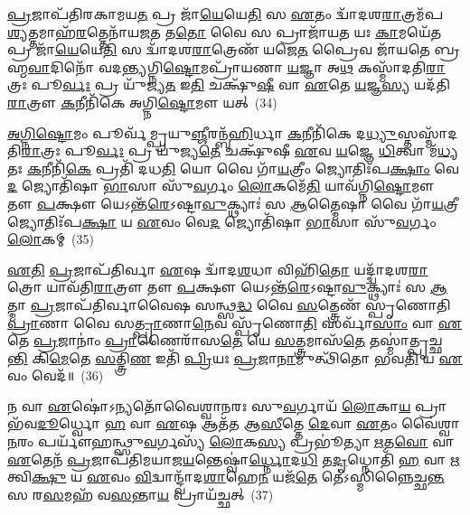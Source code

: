 {\anuvakamend[{\-\ul{𑌏}\-𑌤𑌦𑍍𑌵𑍈 𑌪᳴\-\ul{𑌞𑍍𑌚}\-𑌮𑍇\-𑌽\-\ul{𑌹}\-𑌨𑍍𑌤𑍍𑌰𑍈𑌷𑍍𑌟𑍁᳴𑌭 \ul{𑌏}\-𑌤𑌦𑍍𑌗𑍃᳴𑌹𑍍𑌯𑌤𑍇 \ul{𑌯}\-𑌜𑍍𑌞𑌸𑍍𑌯᳴ 𑌪़\-\ul{𑌞𑍍𑌚}\-𑌮\-\ul{𑌮}\-𑌨𑍍𑌯\-\ul{𑌸𑍍𑌮𑌾} 𑌏𑌕᳴𑌞𑍍𑌚}]}%

\-\ul{𑌪𑍍𑌰}\-𑌜𑌾𑌪᳴𑌤𑌿𑌰𑌕𑌾𑌮𑌯\-\ul{𑌤} 𑌪𑍍𑌰 𑌜𑌾᳴\-\ul{𑌯𑍇}\-𑌯𑍇\-\ul{𑌤𑌿} 𑌸 \ul{𑌏}\-𑌤𑌂 𑌦𑍍𑌵𑌾᳴𑌦𑌶\-\ul{𑌰𑌾}\-𑌤𑍍𑌰𑌮᳴𑌪\-\ul{𑌶𑍍𑌯}\-𑌤𑍍𑌤𑌮𑌾𑌹᳴\-\ul{𑌰}\-𑌤𑍍𑌤𑍇𑌨𑌾᳴𑌯𑌜\-\ul{𑌤} 𑌤\-\ul{𑌤𑍋} 𑌵𑍈 𑌸 𑌪𑍍𑌰𑌾𑌜𑌾᳴𑌯\-\ul{𑌤} 𑌯𑌃 \ul{𑌕𑌾}\-𑌮𑌯𑍇᳴\-\ul{𑌤} 𑌪𑍍𑌰 𑌜𑌾᳴\-\ul{𑌯𑍇}\-𑌯𑍇\-\ul{𑌤𑌿} 𑌸 𑌦𑍍𑌵𑌾᳴𑌦𑌶\-\ul{𑌰𑌾}\-𑌤𑍍𑌰𑍇𑌣᳴ 𑌯𑌜𑍇\-\ul{𑌤} 𑌪𑍍𑌰𑍈𑌵 𑌜𑌾᳴𑌯𑌤𑍇 𑌬𑍍𑌰𑌹𑍍𑌮\-\ul{𑌵𑌾}\-𑌦𑌿𑌨𑍋᳴ 𑌵𑌦𑌨𑍍𑌤𑍍𑌯𑌗𑍍𑌨𑌿\-\ul{𑌷𑍍𑌟𑍋}\-𑌮𑌪𑍍𑌰𑌾᳴𑌯𑌣𑌾 \ul{𑌯}\-𑌜𑍍𑌞𑌾 𑌅\-\ul{𑌥} 𑌕𑌸𑍍𑌮𑌾᳴𑌦𑌤𑌿\-\ul{𑌰𑌾}\-𑌤𑍍𑌰𑌃 𑌪𑍂\-\ul{𑌰𑍍𑌵𑌃} 𑌪𑍍𑌰 𑌯𑍁᳴𑌜𑍍𑌯\-\ul{𑌤} 𑌇\-\ul{𑌤𑌿} 𑌚𑌕𑍍𑌷𑍁᳴\-\ul{𑌷𑍀} 𑌵𑌾 \ul{𑌏}\-𑌤𑍇 \ul{𑌯}\-𑌜𑍍𑌞\-\ul{𑌸𑍍𑌯} 𑌯𑌦᳴𑌤𑌿\-\ul{𑌰𑌾}\-𑌤𑍍𑌰𑍗 \ul{𑌕}\-𑌨𑍀𑌨𑌿᳴𑌕𑍇 𑌅𑌗𑍍𑌨𑌿\-\ul{𑌷𑍍𑌟𑍋}\-𑌮𑍗 𑌯𑌤𑍍~(34)

\-\ul{𑌅}\-\-\ul{𑌗𑍍𑌨𑌿}\-\-\ul{𑌷𑍍𑌟𑍋}\-𑌮𑌂 𑌪𑍂𑌰𑍍𑌵᳴𑌮𑍍𑌪𑍍𑌰𑌯𑍁\-\ul{𑌞𑍍𑌜𑍀}\-𑌰𑌨𑍍𑌬᳴\-\ul{𑌹𑌿}\-𑌰𑍍𑌧𑌾 \ul{𑌕}\-𑌨𑍀𑌨𑌿᳴𑌕𑍇 𑌦\-\ul{𑌧𑍍𑌯𑍁}\-𑌸𑍍𑌤𑌸𑍍𑌮𑌾᳴𑌦𑌤𑌿\-\ul{𑌰𑌾}\-𑌤𑍍𑌰𑌃 𑌪𑍂\-\ul{𑌰𑍍𑌵𑌃} 𑌪𑍍𑌰 𑌯𑍁᳴𑌜𑍍𑌯\-\ul{𑌤𑍇} 𑌚𑌕𑍍𑌷𑍁᳴𑌷𑍀 \ul{𑌏}\-𑌵 \ul{𑌯}\-𑌜𑍍𑌞𑍇 \ul{𑌧𑌿}\-𑌤𑍍𑌵𑌾 𑌮᳴\-\ul{𑌧𑍍𑌯}\-𑌤𑌃 \ul{𑌕}\-𑌨𑍀𑌨𑌿᳴\-\ul{𑌕𑍇} 𑌪𑍍𑌰𑌤𑌿᳴ 𑌦𑌧\-\ul{𑌤𑌿} 𑌯𑍋 𑌵𑍈 𑌗𑌾᳴\-\ul{𑌯}\-𑌤𑍍𑌰𑍀𑌂 𑌜𑍍𑌯𑍋𑌤𑌿𑌃᳴𑌪\-\ul{𑌕𑍍𑌷𑌾𑌂} 𑌵𑍇\-\ul{𑌦} 𑌜𑍍𑌯𑍋𑌤𑌿᳴𑌷𑌾 \ul{𑌭𑌾}\-𑌸𑌾 𑌸𑍁᳴\-\ul{𑌵}\-𑌰𑍍𑌗𑌂 \ul{𑌲𑍋}\-𑌕𑌮𑍇᳴\-\ul{𑌤𑌿} 𑌯𑌾𑌵᳴𑌗𑍍𑌨𑌿\-\ul{𑌷𑍍𑌟𑍋}\-𑌮𑍗 𑌤𑍗 \ul{𑌪}\-𑌕𑍍𑌷𑍗 𑌯𑍇\-𑌽𑌨𑍍𑌤᳴\-\ul{𑌰𑍇}\-\-𑌽𑌷𑍍𑌟𑌾\-\ul{𑌵𑍁}\-𑌕𑍍𑌥𑍍𑌯𑌾𑌃॑ 𑌸 \ul{𑌆}\-𑌤𑍍𑌮𑍈𑌷𑌾 𑌵𑍈 𑌗𑌾᳴\-\ul{𑌯}\-𑌤𑍍𑌰𑍀 𑌜𑍍𑌯𑍋𑌤𑌿𑌃᳴𑌪\-\ul{𑌕𑍍𑌷𑌾} 𑌯 \ul{𑌏}\-𑌵𑌂 𑌵𑍇\-\ul{𑌦} 𑌜𑍍𑌯𑍋𑌤𑌿᳴𑌷𑌾 \ul{𑌭𑌾}\-𑌸𑌾 𑌸𑍁᳴\-\ul{𑌵}\-𑌰𑍍𑌗𑌂 \ul{𑌲𑍋}\-𑌕𑌮𑍍~(35)

\-\ul{𑌏}\-\-\ul{𑌤𑌿} \ul{𑌪𑍍𑌰}\-𑌜𑌾𑌪᳴𑌤𑌿𑌰𑍍𑌵𑌾 \ul{𑌏}\-𑌷 𑌦𑍍𑌵𑌾᳴𑌦\-\ul{𑌶}\-𑌧𑌾 𑌵𑌿𑌹𑌿᳴\-\ul{𑌤𑍋} 𑌯𑌦𑍍𑌦𑍍𑌵𑌾᳴𑌦𑌶\-\ul{𑌰𑌾}\-𑌤𑍍𑌰𑍋 𑌯𑌾𑌵᳴𑌤𑌿\-\ul{𑌰𑌾}\-𑌤𑍍𑌰𑍗 𑌤𑍗 \ul{𑌪}\-𑌕𑍍𑌷𑍗 𑌯𑍇\-𑌽𑌨𑍍𑌤᳴\-\ul{𑌰𑍇}\-\-𑌽𑌷𑍍𑌟𑌾\-\ul{𑌵𑍁}\-𑌕𑍍𑌥𑍍𑌯𑌾𑌃॑ 𑌸 \ul{𑌆}\-𑌤𑍍𑌮𑌾 \ul{𑌪𑍍𑌰}\-𑌜𑌾𑌪᳴𑌤𑌿𑌰𑍍𑌵𑌾𑌵𑍈𑌷 𑌸𑌨𑍍𑌥𑍍𑌸\-\ul{𑌦𑍍𑌧} 𑌵𑍈 \ul{𑌸}\-𑌤𑍍𑌤𑍍𑌰𑍇𑌣᳴ 𑌸𑍍𑌪𑍃𑌣𑍋𑌤𑌿 \ul{𑌪𑍍𑌰𑌾}\-𑌣𑌾 𑌵𑍈 𑌸\-\ul{𑌤𑍍𑌪𑍍𑌰𑌾}\-𑌣𑌾\-\ul{𑌨𑍇}\-𑌵 𑌸𑍍𑌪𑍃᳴𑌣𑍋\-\ul{𑌤𑌿} 𑌸𑌰𑍍𑌵𑌾᳴\-\ul{𑌸𑌾𑌂} 𑌵𑌾 \ul{𑌏}\-𑌤𑍇 \ul{𑌪𑍍𑌰}\-𑌜𑌾𑌨𑌾𑌂॑ \ul{𑌪𑍍𑌰𑌾}\-𑌣𑍈𑌰𑌾᳴𑌸\-\ul{𑌤𑍇} 𑌯𑍇 \ul{𑌸}\-𑌤𑍍𑌤𑍍𑌰𑌮𑌾𑌸᳴\-\ul{𑌤𑍇} 𑌤𑌸𑍍𑌮𑌾॑𑌤𑍍𑌪𑍃𑌚𑍍𑌛\-\ul{𑌨𑍍𑌤𑌿} 𑌕𑌿\-\ul{𑌮𑍇}\-𑌤𑍇 \ul{𑌸}\-𑌤𑍍𑌤𑍍𑌰𑌿\-\ul{𑌣} 𑌇𑌤𑌿᳴ \ul{𑌪𑍍𑌰𑌿}\-𑌯𑌃 \ul{𑌪𑍍𑌰}\-𑌜𑌾\-\ul{𑌨𑌾}\-𑌮𑍁𑌤𑍍𑌥𑌿᳴𑌤𑍋 𑌭𑌵\-\ul{𑌤𑌿} 𑌯 \ul{𑌏}\-𑌵𑌂 𑌵𑍇𑌦᳴॥~(36)

{\anuvakamend[{\-\ul{𑌅}\-\-\ul{𑌗𑍍𑌨𑌿}\-\-\ul{𑌷𑍍𑌟𑍋}\-𑌮𑍗 𑌯𑌥𑍍𑌸𑍁᳴\-\ul{𑌵}\-𑌰𑍍𑌗\-\ul{𑌲𑍍𑌲𑍋𑌂}\-𑌕𑌂 \ul{𑌪𑍍𑌰𑌿}\-𑌯𑌃 \ul{𑌪𑍍𑌰}\-𑌜𑌾\-\ul{𑌨𑌾𑌂} 𑌪𑌞𑍍𑌚᳴ 𑌚}]}%

𑌨 𑌵𑌾 \ul{𑌏}\-𑌷𑍋॑\-𑌽𑌨𑍍𑌯𑌤𑍋᳴𑌵𑍈𑌶𑍍𑌵𑌾𑌨𑌰𑌃 𑌸𑍁\-\ul{𑌵}\-𑌰𑍍𑌗𑌾𑌯᳴ \ul{𑌲𑍋}\-𑌕𑌾\-\ul{𑌯} 𑌪𑍍𑌰𑌾𑌭᳴𑌵\-\ul{𑌦𑍂}\-𑌰𑍍𑌧𑍍𑌵𑍋 \ul{𑌹} 𑌵𑌾 \ul{𑌏}\-𑌷 𑌆𑌤᳴𑌤 𑌆\-\ul{𑌸𑍀}\-𑌤𑍍𑌤𑍇 \ul{𑌦𑍇}\-𑌵𑌾 \ul{𑌏}\-𑌤𑌂 𑌵𑍈॑𑌶𑍍𑌵𑌾\-\ul{𑌨}\-𑌰𑌂 𑌪𑌰𑍍𑌯𑍗᳴𑌹𑌨𑍍𑌥𑍍𑌸𑍁\-\ul{𑌵}\-𑌰𑍍𑌗𑌸𑍍𑌯᳴ \ul{𑌲𑍋}\-𑌕\-\ul{𑌸𑍍𑌯} 𑌪𑍍𑌰𑌭𑍂॑𑌤𑍍𑌯𑌾 \ul{𑌋}\-𑌤\-\ul{𑌵𑍋} 𑌵𑌾 \ul{𑌏}\-𑌤𑍇𑌨᳴ \ul{𑌪𑍍𑌰}\-𑌜𑌾𑌪᳴𑌤𑌿𑌮𑌯𑌾𑌜\-\ul{𑌯}\-𑌨𑍍𑌤𑍇𑌷𑍍𑌵𑌾॑\-\ul{𑌰𑍍𑌧𑍍𑌨𑍋}\-𑌦\-\ul{𑌧𑌿} 𑌤\-\ul{𑌦𑍃}\-𑌧𑍍𑌨𑍋𑌤𑌿᳴ \ul{𑌹} 𑌵𑌾 \ul{𑌋}\-𑌤𑍍𑌵𑌿\-\ul{𑌕𑍍𑌷𑍁} 𑌯 \ul{𑌏}\-𑌵𑌂 \ul{𑌵𑌿}\-𑌦𑍍𑌵𑌾𑌨𑍍𑌦𑍍𑌵𑌾᳴𑌦\-\ul{𑌶𑌾}\-𑌹𑍇\-\ul{𑌨} 𑌯𑌜᳴\-\ul{𑌤𑍇} 𑌤𑍇॑\-𑌽𑌸𑍍𑌮𑌿𑌨𑍍𑌨𑍈𑌚𑍍𑌛\-\ul{𑌨𑍍𑌤} 𑌸 𑌰\-\ul{𑌸}\-𑌮𑌹᳴ 𑌵\-\ul{𑌸}\-𑌨𑍍𑌤𑌾\-\ul{𑌯} 𑌪𑍍𑌰𑌾𑌯᳴𑌚𑍍𑌛𑌤𑍍~(37)

